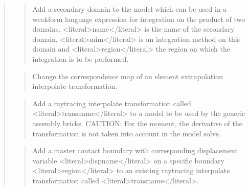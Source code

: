 \documentclass[a4paper,11pt,english]{sphinxmanual}
\begin{document}
\begin{quote}
\begin{quote}
\sphinxAtStartPar
Add a secondary domain to the model which can be used in a weak\sphinxhyphen{}form language expression for integration on the product of two domains. \textless{}literal\textgreater{}name\textless{}/literal\textgreater{} is the name
of the secondary domain, \textless{}literal\textgreater{}mim\textless{}/literal\textgreater{} is an integration method on this domain
and \textless{}literal\textgreater{}region\textless{}/literal\textgreater{} the region on which the integration is to be performed.
\end{quote}

\sphinxAtStartPar
{}
\begin{quote}

\sphinxAtStartPar
Change the correspondence map of an element extrapolation interpolate
transformation.
\end{quote}

\sphinxAtStartPar
{}
\begin{quote}

\sphinxAtStartPar
Add a raytracing interpolate transformation called \textless{}literal\textgreater{}transname\textless{}/literal\textgreater{} to a model
to be used by the generic assembly bricks.
CAUTION: For the moment, the derivative of the
transformation is not taken into account in the model solve.
\end{quote}

\sphinxAtStartPar
{}
\begin{quote}

\sphinxAtStartPar
Add a master contact boundary with corresponding displacement variable
\textless{}literal\textgreater{}dispname\textless{}/literal\textgreater{} on a specific boundary \textless{}literal\textgreater{}region\textless{}/literal\textgreater{} to an existing raytracing
interpolate transformation called \textless{}literal\textgreater{}transname\textless{}/literal\textgreater{}.
\end{quote}

\sphinxAtStartPar
{}
\begin{quote}


\end{quote}
\end{quote}
\end{document}
